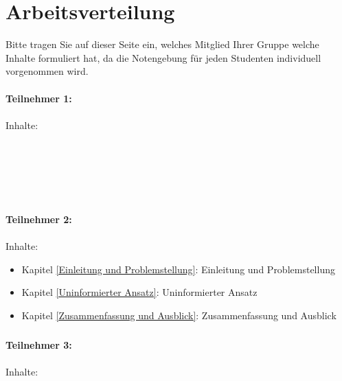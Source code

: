 \chapter*{Arbeitsverteilung}

Bitte tragen Sie auf dieser Seite ein, welches Mitglied Ihrer Gruppe welche Inhalte formuliert hat, da die Notengebung für jeden Studenten individuell vorgenommen wird.\\
\\
\textbf{Teilnehmer 1:} \\
\\
 Inhalte: \\
\\
\\
\\
\\
\\
\\
\textbf{Teilnehmer 2:} \\
\\
 Inhalte: 
\begin{itemize}
    \item Kapitel \ref{Einleitung und Problemstellung}: Einleitung und Problemstellung
    \item Kapitel \ref{Uninformierter Ansatz}: Uninformierter Ansatz
    \item Kapitel \ref{Zusammenfassung und Ausblick}: Zusammenfassung und Ausblick
\end{itemize}

\paragraph*{}
\textbf{Teilnehmer 3:} \\
\\
 Inhalte: 